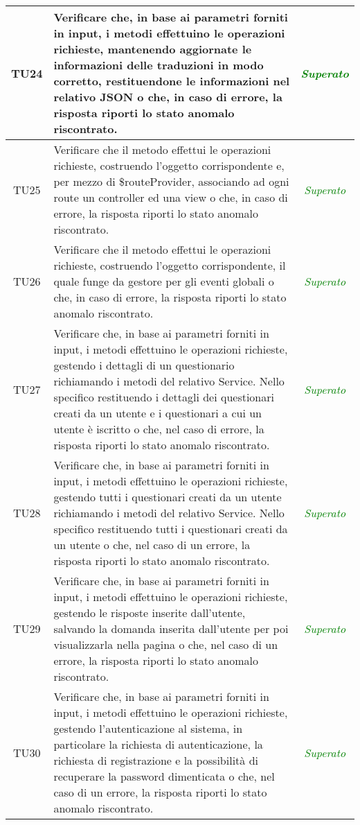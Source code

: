 \begin{longtable}{|c|>{}m{10cm}|c|}
\hypertarget{TU24}{TU24} & Verificare che, in base ai parametri forniti in input, i metodi effettuino le operazioni richieste, mantenendo aggiornate le informazioni delle traduzioni in modo corretto, restituendone le informazioni nel relativo JSON o che, in caso di errore, la risposta riporti lo stato anomalo riscontrato. & \textcolor{Green}{\textit{Superato}}\\ \hline
\hypertarget{TU25}{TU25} & Verificare che il metodo effettui le operazioni richieste, costruendo l’oggetto corrispondente e, per mezzo
di \$routeProvider, associando ad ogni route un controller ed una view o che, in caso di errore, la
risposta riporti lo stato anomalo riscontrato. & \textcolor{Green}{\textit{Superato}}\\ \hline
\hypertarget{TU26}{TU26} & Verificare che il metodo effettui le operazioni richieste, costruendo l’oggetto corrispondente, il quale funge da gestore per gli eventi globali o che, in caso di
errore, la risposta riporti lo stato anomalo riscontrato. & \textcolor{Green}{\textit{Superato}}\\ \hline
\hypertarget{TU27}{TU27} & Verificare che, in base ai parametri forniti in input, i metodi effettuino le operazioni richieste, gestendo i dettagli di un questionario richiamando i metodi del relativo Service. Nello specifico restituendo i dettagli dei questionari creati da un utente e i questionari a cui un utente è iscritto o che, nel caso di errore, la risposta riporti lo stato anomalo riscontrato. & \textcolor{Green}{\textit{Superato}}\\ \hline
\hypertarget{TU28}{TU28} & Verificare che, in base ai parametri forniti in input, i metodi effettuino le operazioni richieste, gestendo tutti i questionari creati da un utente richiamando i metodi del relativo Service. Nello specifico restituendo tutti i questionari creati da un utente o che, nel caso di un errore, la risposta riporti lo stato anomalo riscontrato.  & \textcolor{Green}{\textit{Superato}}\\ \hline
\hypertarget{TU29}{TU29} & Verificare che, in base ai parametri forniti in input, i metodi effettuino le operazioni richieste, gestendo le risposte inserite dall'utente, salvando la domanda inserita dall'utente per poi visualizzarla nella pagina o che, nel caso di un errore, la risposta riporti lo stato anomalo riscontrato. & \textcolor{Green}{\textit{Superato}}\\ \hline
\hypertarget{TU30}{TU30} & Verificare che, in base ai parametri forniti in input, i metodi effettuino le operazioni richieste, gestendo l'autenticazione al sistema, in particolare la richiesta di autenticazione, la richiesta di registrazione e la possibilità di recuperare la password dimenticata o che, nel caso di un errore, la risposta riporti lo stato anomalo riscontrato. & \textcolor{Green}{\textit{Superato}}\\ \hline

\end{longtable}
